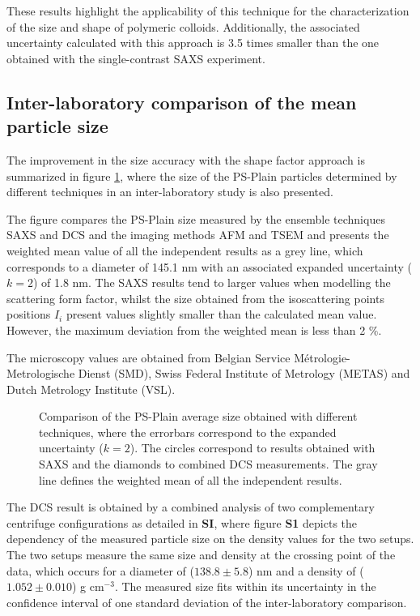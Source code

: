 These results highlight the applicability of this technique for the characterization of the size and shape of polymeric colloids. Additionally, the associated uncertainty calculated with this approach is 3.5 times smaller than the one obtained with the single-contrast SAXS experiment. 

\subsection{Inter-laboratory comparison of the mean particle size}
The improvement in the size accuracy with the shape factor approach is summarized in figure \ref{fig:PSPlainSizeComparison}, where the size of the PS-Plain particles determined by different techniques in an inter-laboratory study is also presented\citep{nicolet_inter-laboratory_2016}.

The figure compares the PS-Plain size measured by the ensemble techniques SAXS and DCS and the imaging methods AFM and TSEM and presents the weighted mean value of all the independent results as a grey line, which corresponds to a diameter of 145.1 nm with an associated expanded uncertainty ($k=2$) of 1.8 nm. The SAXS results tend to larger values when modelling the scattering form factor, whilst the size obtained from the isoscattering points positions $I_i$ present values slightly smaller than the calculated mean value. However, the maximum deviation from the weighted mean is less than 2 $\%$.

The microscopy values are obtained from Belgian Service Métrologie-Metrologische Dienst (SMD), Swiss Federal Institute of Metrology (METAS) and Dutch Metrology Institute (VSL).

\begin{figure}
	\centering
		
	\caption{Comparison of the PS-Plain average size obtained with different techniques, where the errorbars correspond to the expanded uncertainty ($k=2$). The circles correspond to results obtained with SAXS and the diamonds to combined DCS measurements. The gray line defines the weighted mean of all the independent results.}
	\label{fig:PSPlainSizeComparison}
\end{figure}

The DCS result is obtained by a combined analysis of two complementary centrifuge configurations as detailed in \textbf{SI}, where figure \textbf{S1} depicts the dependency of the measured particle size on the density values for the two setups. The two setups measure the same size and density at the crossing point of the data, which occurs for a diameter of ($138.8\pm5.8$) nm and a density of ($1.052\pm0.010$) g cm$^{-3}$. The measured size fits within its uncertainty in the confidence interval of one standard deviation of the inter-laboratory comparison.
 
